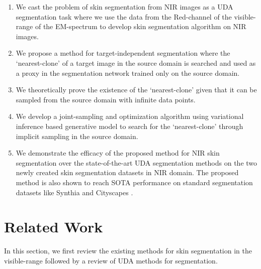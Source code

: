\documentclass[runningheads]{llncs}
\begin{document}
\begin{enumerate}
    \item We cast the problem of skin segmentation from NIR images as a UDA segmentation task where we use the data from the Red-channel of the visible-range of the EM-spectrum to develop skin segmentation algorithm on NIR images.
    \item We propose a method for target-independent segmentation where the `nearest-clone' of a target image in the source domain is searched and used as a proxy in the segmentation network trained only on the source domain. 
    \item We theoretically prove the existence of the `nearest-clone' given that it can be sampled from the source domain with infinite data points. 
    \item We develop a joint-sampling and optimization algorithm using variational inference based generative model to search for the `nearest-clone' through implicit sampling in the source domain. 
    \item We demonstrate the efficacy of the proposed method for NIR skin segmentation over the state-of-the-art UDA segmentation methods on the two newly created skin segmentation datasets in NIR domain. The proposed method is also shown to reach SOTA performance on standard segmentation datasets like Synthia \cite{ros2016synthia} and Cityscapes \cite{cordts2016cityscapes}. 
\end{enumerate}
\section{Related Work}
In this section, we first review the existing methods for skin segmentation in the visible-range followed by a review of UDA methods for segmentation. 
\end{document}
